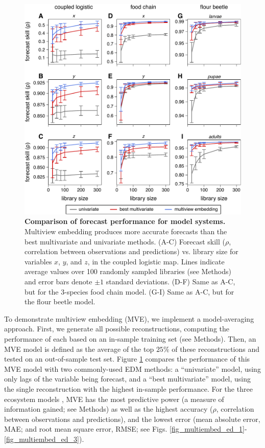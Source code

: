 \begin{figure}[!ht]
\begin{center}\includegraphics[width=\textwidth]{fig_multiembed_3.pdf}\end{center}
\caption[Comparison of forecast performance for model systems.]{\textbf{Comparison of forecast performance for model systems.}\newline
Multiview embedding produces more accurate forecasts than the best multivariate and univariate methods. (A-C) Forecast skill ($\rho$, correlation between observations and predictions) vs. library size for variables $x$, $y$, and $z$, in the coupled logistic map. Lines indicate average values over 100 randomly sampled libraries (see Methods) and error bars denote $\pm 1$ standard deviations. (D-F) Same as A-C, but for the 3-species food chain model. (G-I) Same as A-C, but for the flour beetle model.}
\label{fig_multiembed_model_results}
\end{figure}

To demonstrate multiview embedding (MVE), we implement a model-\linebreak averaging approach. First, we generate all possible reconstructions, computing the performance of each based on an in-sample training set (see Methods). Then, an MVE model is defined as the average of the top $25\%$ of these reconstructions and tested on an out-of-sample test set. Figure \ref{fig_multiembed_model_results} compares the performance of this MVE model with two commonly-used EDM methods: a ``univariate'' model, using only lags of the variable being forecast, and a ``best multivariate'' model, using the single reconstruction with the highest in-sample performance. For the three ecosystem models \cite{Hastings_1991, Dennis_2001}, MVE has the most predictive power (a measure of information gained; see Methods) as well as the highest accuracy ($\rho$, correlation between observations and predictions), and the lowest error (mean absolute error, MAE; and root mean square error, RMSE; see Figs. \ref{fig_multiembed_ed_1}-\ref{fig_multiembed_ed_3}).

